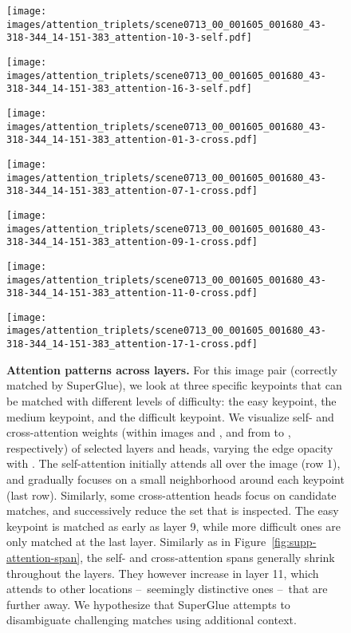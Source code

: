 \documentclass[10pt,twocolumn,letterpaper]{article}
\renewcommand{\*}[1]{\mathbf{#1}}
\newcommand{\0}{\phantom{0}}
\begin{document}
\begin{figure*}[ht!]
\begin{minipage}{\iwidth\textwidth}
    \vspace{.5mm}
    \texttt{[image: images/attention\_triplets/scene0713\_00\_001605\_001680\_43-318-344\_14-151-383\_attention-10-3-self.pdf]}

    \vspace{.5mm}
    \texttt{[image: images/attention\_triplets/scene0713\_00\_001605\_001680\_43-318-344\_14-151-383\_attention-16-3-self.pdf]}
\end{minipage}\hspace{5mm}\begin{minipage}{\iwidth\textwidth}
    \texttt{[image: images/attention\_triplets/scene0713\_00\_001605\_001680\_43-318-344\_14-151-383\_attention-01-3-cross.pdf]}
    
    \vspace{.5mm}
    \texttt{[image: images/attention\_triplets/scene0713\_00\_001605\_001680\_43-318-344\_14-151-383\_attention-07-1-cross.pdf]}
    
    \vspace{.5mm}
    \texttt{[image: images/attention\_triplets/scene0713\_00\_001605\_001680\_43-318-344\_14-151-383\_attention-09-1-cross.pdf]}
    
    \vspace{.5mm}
    \texttt{[image: images/attention\_triplets/scene0713\_00\_001605\_001680\_43-318-344\_14-151-383\_attention-11-0-cross.pdf]}
    
    \vspace{.5mm}
    \texttt{[image: images/attention\_triplets/scene0713\_00\_001605\_001680\_43-318-344\_14-151-383\_attention-17-1-cross.pdf]}
\end{minipage}

\vspace{-.1cm}
\caption{{\bf Attention patterns across layers.} For this image pair (correctly matched by SuperGlue), we look at three specific keypoints that can be matched with different levels of difficulty: the {\color{green}easy keypoint}, the {\color[rgb]{0,.8,1}medium keypoint}, and the {\color{red}difficult keypoint}.
We visualize self- and cross-attention weights (within images  and , and from  to , respectively) of selected layers and heads, varying the edge opacity with .
The self-attention initially attends all over the image (row 1), and gradually focuses on a small neighborhood around each keypoint (last row). Similarly, some cross-attention heads focus on candidate matches, and successively reduce the set that is inspected. The {\color{green}easy keypoint} is matched as early as layer 9, while more difficult ones are only matched at the last layer.
Similarly as in Figure~\ref{fig:supp-attention-span}, the self- and cross-attention spans generally shrink throughout the layers. They however increase in layer 11, which attends to other locations --~seemingly distinctive ones --~that are further away. We hypothesize that SuperGlue attempts to disambiguate challenging matches using additional context.
}
\label{fig:supp-attention-qualitative}
\end{figure*} \fi
\else
\clearpage
\appendix
\end{document}

